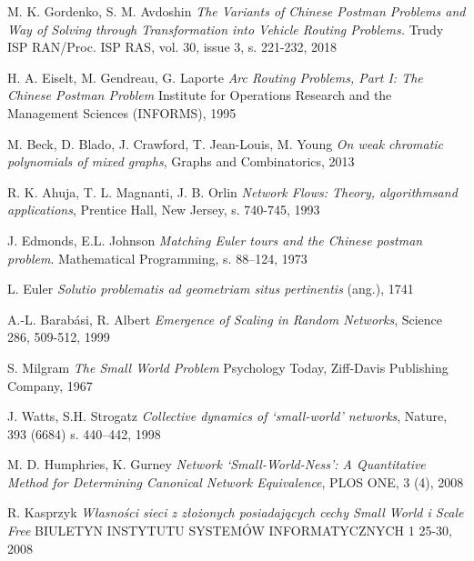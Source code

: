 \documentclass[a4paper, 12pt, twoside, openright]{article}
\begin{document}
\newpage

\begin{thebibliography}{99}
	
		M. K. Gordenko, S. M. Avdoshin \textit{The Variants of Chinese Postman Problems and Way of Solving through Transformation into Vehicle Routing Problems.} Trudy ISP RAN/Proc. ISP RAS, vol. 30, issue 3, s. 221-232, 2018
	
		H. A. Eiselt, M. Gendreau, G. Laporte \textit{Arc Routing Problems, Part I: The Chinese Postman Problem}  Institute for Operations Research and the Management Sciences (INFORMS), 1995
	
		M. Beck, D. Blado, J. Crawford, T. Jean-Louis, M. Young \textit{On weak chromatic polynomials of mixed graphs}, Graphs and Combinatorics, 2013

		R. K. Ahuja, T. L. Magnanti, J. B. Orlin \textit{Network  Flows:  Theory,  algorithmsand applications}, Prentice Hall, New Jersey, s. 740-745, 1993
	
		J. Edmonds, E.L. Johnson \textit{Matching Euler tours and the Chinese postman problem}. Mathematical Programming, s. 88–124, 1973
	
		L. Euler \textit{Solutio problematis ad geometriam situs pertinentis} (ang.), 1741
	
	
	A.-L. Barabási, R. Albert \textit{Emergence of Scaling in Random Networks}, Science 286, 509-512, 1999


	S. Milgram \textit{The Small World Problem} Psychology Today, Ziff-Davis Publishing Company, 1967
	
	J. Watts, S.H. Strogatz \textit{Collective dynamics of ‘small-world’ networks}, Nature, 393 (6684) s. 440–442, 1998	
	
	
	M. D. Humphries, K. Gurney \textit{Network ‘Small-World-Ness’: A Quantitative Method for Determining Canonical Network Equivalence}, PLOS ONE, 3 (4), 2008	
	
	R. Kasprzyk \textit{Własności sieci z złożonych posiadających cechy
	Small World i Scale Free} BIULETYN INSTYTUTU SYSTEMÓW INFORMATYCZNYCH 1 25-30, 2008	

	
	

\end{thebibliography}
\end{document}
